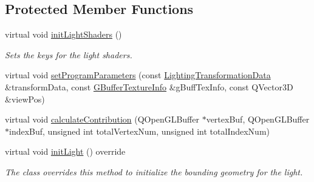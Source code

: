 \subsection*{Protected Member Functions}
\begin{DoxyCompactItemize}
\item 
\mbox{\label{class_geometry_engine_1_1_geometry_world_item_1_1_geometry_light_1_1_point_light_a753a40c1c3c3a9a550980c002c636cfa}} 
virtual void \mbox{\hyperlink{class_geometry_engine_1_1_geometry_world_item_1_1_geometry_light_1_1_point_light_a753a40c1c3c3a9a550980c002c636cfa}{init\+Light\+Shaders}} ()
\begin{DoxyCompactList}\small\item\em Sets the keys for the light shaders. \end{DoxyCompactList}\item 
virtual void \mbox{\hyperlink{class_geometry_engine_1_1_geometry_world_item_1_1_geometry_light_1_1_point_light_acf3ebd411b36d95ba26ae41bcc25793a}{set\+Program\+Parameters}} (const \mbox{\hyperlink{struct_geometry_engine_1_1_lighting_transformation_data}{Lighting\+Transformation\+Data}} \&transform\+Data, const \mbox{\hyperlink{struct_geometry_engine_1_1_g_buffer_texture_info}{G\+Buffer\+Texture\+Info}} \&g\+Buff\+Tex\+Info, const Q\+Vector3D \&view\+Pos)
\item 
virtual void \mbox{\hyperlink{class_geometry_engine_1_1_geometry_world_item_1_1_geometry_light_1_1_point_light_aa30244fd20e61fdfe1ac1d85c99fd154}{calculate\+Contribution}} (Q\+Open\+G\+L\+Buffer $\ast$vertex\+Buf, Q\+Open\+G\+L\+Buffer $\ast$index\+Buf, unsigned int total\+Vertex\+Num, unsigned int total\+Index\+Num)
\item 
\mbox{\label{class_geometry_engine_1_1_geometry_world_item_1_1_geometry_light_1_1_point_light_a0c6434862dabcbe1e32e04b8d73b5314}} 
virtual void \mbox{\hyperlink{class_geometry_engine_1_1_geometry_world_item_1_1_geometry_light_1_1_point_light_a0c6434862dabcbe1e32e04b8d73b5314}{init\+Light}} () override
\begin{DoxyCompactList}\small\item\em The class overrides this method to initialize the bounding geometry for the light. \end{DoxyCompactList}\end{DoxyCompactItemize}
